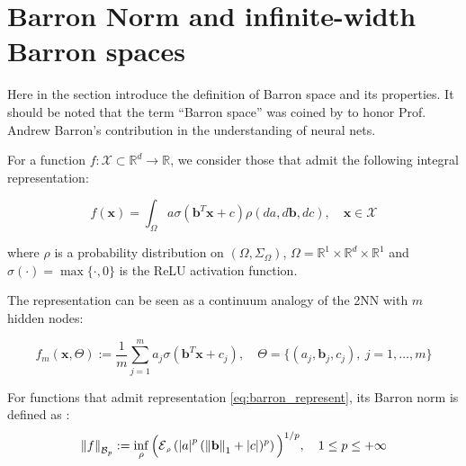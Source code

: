 \newpage

\section{Barron Norm and infinite-width Barron spaces}
\label{sec:barron_norm}

Here in the section introduce the definition of Barron space and its properties.
It should be noted that the term ``Barron space'' was coined by
\cite{ePrioriEstimatesPopulation2019} to honor Prof. Andrew Barron's
contribution in the understanding of neural nets.

For a function $f: \mathcal{X} \subset \mathbb{R}^d \to \mathbb{R}$, we consider
those that admit the following integral representation:

\begin{equation}\label{eq:barron_represent}
    f(\mathbf{x}) = \int_{\Omega} a \sigma(\mathbf{b}^T\mathbf{x} + c) \rho(da, d\mathbf{b}, dc), \quad \mathbf{x} \in \mathcal{X}
\end{equation}

where $\rho$ is a probability distribution on $(\Omega, \Sigma_\Omega)$, $\Omega
    = \mathbb{R}^1 \times \mathbb{R}^d \times \mathbb{R}^1$ and $\sigma(\cdot) =
    \max\{\cdot, 0\}$ is the ReLU activation function.

The representation can be seen as a continuum analogy of the 2NN with $m$ hidden
nodes:

\begin{equation}
    f_m(\mathbf{x}, \Theta) := \frac{1}{m} \sum_{j=1}^m a_j \sigma(\mathbf{b}^T\mathbf{x} + c_j), \quad \Theta = \{(a_j, \mathbf{b}_j, c_j), \ j = 1, \dots, m\}
\end{equation}

\begin{definition} For functions that admit representation
    \eqref{eq:barron_represent}, its Barron norm is defined as
    \cite{eBarronSpaceFlowinduced2021}:
    \begin{equation}\label{eq:barron_norm}
        \barronnorm{f}{p} := \inf_{\rho} \Big(\ERWi{\rho}{\abs{a}^p (\norm{\mathbf{b}}_1 + \abs{c})^p}\Big)^{1/p}, \quad 1 \leq p \leq +\infty
    \end{equation}
\end{definition}

